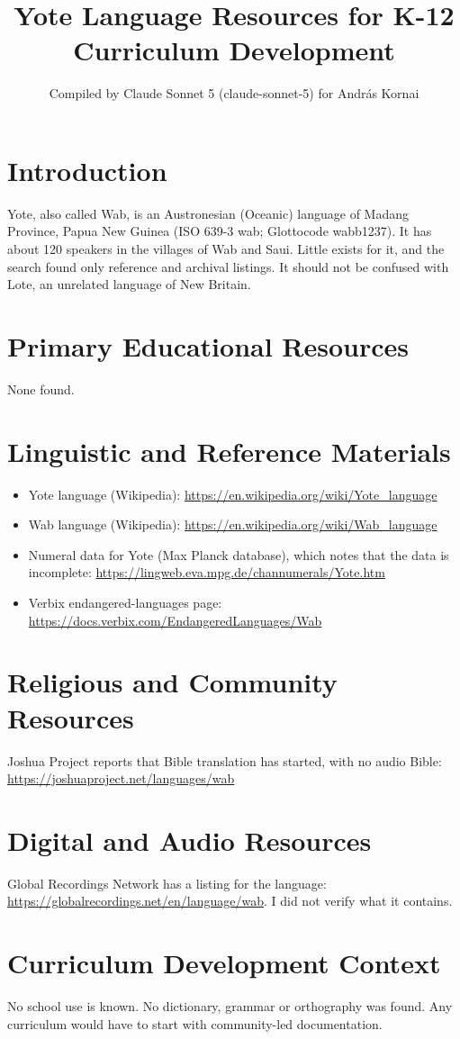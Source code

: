 \documentclass[12pt]{article}
\title{Yote Language Resources for K-12 Curriculum Development}
\author{Compiled by Claude Sonnet 5 (claude-sonnet-5) for Andr\'as Kornai}
\date{}
\begin{document}
\maketitle

\section{Introduction}
Yote, also called Wab, is an Austronesian (Oceanic) language of Madang Province, Papua New Guinea (ISO 639-3 wab; Glottocode wabb1237). It has about 120 speakers in the villages of Wab and Saui. Little exists for it, and the search found only reference and archival listings. It should not be confused with Lote, an unrelated language of New Britain.

\section{Primary Educational Resources}
None found.

\section{Linguistic and Reference Materials}
\begin{itemize}
\item Yote language (Wikipedia): \url{https://en.wikipedia.org/wiki/Yote_language}
\item Wab language (Wikipedia): \url{https://en.wikipedia.org/wiki/Wab_language}
\item Numeral data for Yote (Max Planck database), which notes that the data is incomplete: \url{https://lingweb.eva.mpg.de/channumerals/Yote.htm}
\item Verbix endangered-languages page: \url{https://docs.verbix.com/EndangeredLanguages/Wab}
\end{itemize}

\section{Religious and Community Resources}
Joshua Project reports that Bible translation has started, with no audio Bible: \url{https://joshuaproject.net/languages/wab}

\section{Digital and Audio Resources}
Global Recordings Network has a listing for the language: \url{https://globalrecordings.net/en/language/wab}. I did not verify what it contains.

\section{Curriculum Development Context}
No school use is known. No dictionary, grammar or orthography was found. Any curriculum would have to start with community-led documentation.
\end{document}
